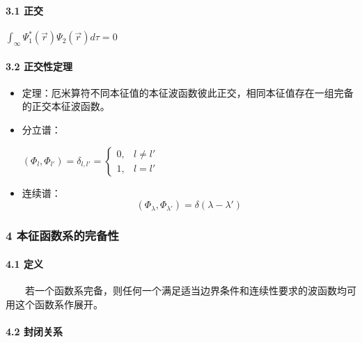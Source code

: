 \documentclass[UTF8,twocolumn]{ctexart}
\providecommand{\tightlist}{%
  \setlength{\itemsep}{0pt}\setlength{\parskip}{0pt}}
\let\oldparagraph\paragraph
\renewcommand{\paragraph}[1]{\oldparagraph{#1}\mbox{}}
\begin{document}
\hypertarget{ux6b63ux4ea4}{%
\paragraph{ 3.1 正交}\label{ux6b63ux4ea4}}

\begin{center}
\(\int_{\infty}\Psi_1^*(\vec{r})\Psi_2(\vec{r})d\tau=0\)
\end{center}

\hypertarget{ux6b63ux4ea4ux6027ux5b9aux7406-1}{%
\paragraph{ 3.2 正交性定理}\label{ux6b63ux4ea4ux6027ux5b9aux7406-1}}

\begin{itemize}
\tightlist
\item
  定理：厄米算符不同本征值的本征波函数彼此正交，相同本征值存在一组完备的正交本征波函数。
\item
  分立谱： 
  \begin{center}
  $(\Phi_l,\Phi_{l'})=\delta_{l,l'}=
  \begin{cases}
    0, & l\neq l'\\
    1, & l=l'
  \end{cases}$
  \end{center}
\item
  连续谱： 
  $$(\Phi_{\lambda},\Phi_{\lambda'})=\delta(\lambda-\lambda')$$
\end{itemize}

\hypertarget{ux672cux5f81ux51fdux6570ux7cfbux7684ux5b8cux5907ux6027}{%
\subsubsection{4
本征函数系的完备性}\label{ux672cux5f81ux51fdux6570ux7cfbux7684ux5b8cux5907ux6027}}

\hypertarget{ux5b9aux4e49-2}{%
\paragraph{ 4.1 定义}\label{ux5b9aux4e49-2}}

  若一个函数系完备，则任何一个满足适当边界条件和连续性要求的波函数均可用这个函数系作展开。

\hypertarget{ux5c01ux95edux5173ux7cfb}{%
\paragraph{ 4.2 封闭关系}\label{ux5c01ux95edux5173ux7cfb}}
\end{document}
